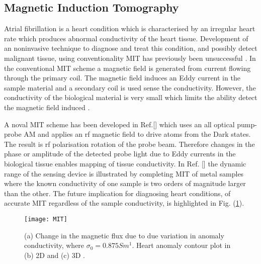 \subsection{Magnetic Induction Tomography}
Atrial fibrillation is a heart condition which is characterised by an irregular heart rate which produces abnormal conductivity of the heart tissue. Development of an noninvasive technique to diagnose and treat this condition, and possibly detect malignant tissue, using conventionality MIT has previously been unsuccessful \citep{Marmugi2016OpticalHeart}. In the conventional MIT scheme a magnetic field is generated from current flowing through the primary coil. The magnetic field induces an Eddy current in the sample material and a secondary coil is used sense the conductivity. However, the conductivity of the biological material is very small which limits the ability detect the magnetic field induced \citep{Griffiths2001MagneticTomography}. 






A noval MIT scheme has been developed in Ref.[] which uses an all optical pump-probe AM and applies an rf magnetic field to drive atoms from the Dark states. The result is rf polarisation rotation of the probe beam. Therefore changes in the phase or amplitude of the detected probe light due to Eddy currents in the biological tissue enables mapping of tissue conductivity. In Ref. [] the dynamic range of the sensing device is illustrated by completing MIT of metal samples where the known conductivity of one sample is two orders of magnitude larger than the other. The future implication for diagnosing heart conditions, of accurate MIT regardless of the sample conductivity, is highlighted in Fig. (\ref{fig:MIT}).

\begin{figure}[h]
\texttt{[image: MIT]}
\caption{\label{fig:MIT}(a) Change in the magnetic flux due to due variation in anomaly conductivity, where $\sigma_{0}=0.875 Sm^{1}$. Heart anomaly contour plot in (b) 2D and (c) 3D \citep{Deans2016OpticalHeart}.}
\end{figure}

